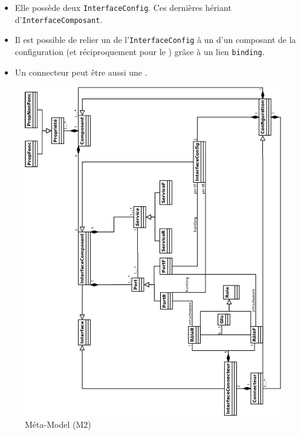 \begin{itemize}
\item 
  Elle possède deux \verb+InterfaceConfig+. Ces dernières hériant d'\verb+InterfaceComposant+.
\item
  Il est possible de relier un \portr{} de l'\verb+InterfaceConfig+ à un \portr{} d'un composant de la configuration (et réciproquement pour le \portf) grâce à un lien \verb+binding+.
\item
  Un connecteur peut être aussi une \configuration.
\end{itemize}
\pagestyle{empty}
\begin{figure}[htb]
  \includegraphics[scale=0.36]{img/M2}
  \caption{Méta-Model (M2)}
  \label{fig:M2}
\end{figure}
